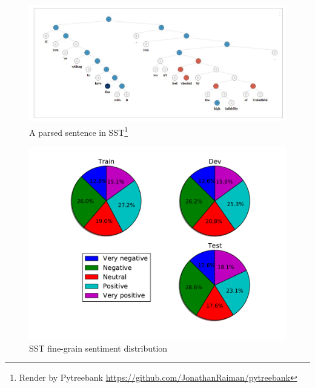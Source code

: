\begin{figure}[H]
    \begin{minipage}{\textwidth}
        \centering
        \includegraphics[width=0.9\linewidth]{figure/sst}
        \caption[A parsed sentence in SST]{A parsed sentence in SST\footnote{Render by Pytreebank \url{https://github.com/JonathanRaiman/pytreebank}}}
        \label{fig:sst}
    \end{minipage}
\end{figure}

\begin{figure}[H]
    \begin{minipage}{\textwidth}
        \centering
        \includegraphics[width=0.9\linewidth]{figure/sstfinegrain}
        \caption[SST fine-grain sentiment distribution]{SST fine-grain sentiment distribution}
        \label{fig:sstfinegrain}
    \end{minipage}
\end{figure}

